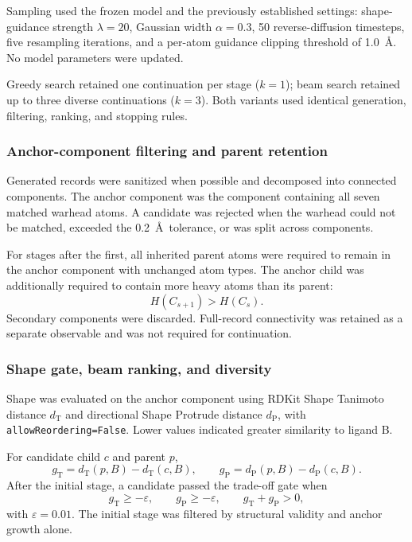 Sampling used the frozen model and the previously established settings:
shape-guidance strength \(\lambda=20\), Gaussian width \(\alpha=0.3\),
50 reverse-diffusion timesteps, five resampling iterations, and a
per-atom guidance clipping threshold of 1.0~\AA. No model parameters
were updated.

Greedy search retained one continuation per stage (\(k=1\)); beam search
retained up to three diverse continuations (\(k=3\)). Both variants used
identical generation, filtering, ranking, and stopping rules.

\subsubsection{Anchor-component filtering and parent retention}

Generated records were sanitized when possible and decomposed into
connected components. The anchor component was the component containing
all seven matched warhead atoms. A candidate was rejected when the
warhead could not be matched, exceeded the 0.2~\AA\ tolerance, or was
split across components.

For stages after the first, all inherited parent atoms were required to
remain in the anchor component with unchanged atom types. The anchor
child was additionally required to contain more heavy atoms than its
parent:
\[
H(C_{s+1})>H(C_s).
\]
Secondary components were discarded. Full-record connectivity was
retained as a separate observable and was not required for continuation.

\subsubsection{Shape gate, beam ranking, and diversity}

Shape was evaluated on the anchor component using RDKit Shape Tanimoto
distance \(d_{\mathrm{T}}\) and directional Shape Protrude distance
\(d_{\mathrm{P}}\), with \texttt{allowReordering=False}. Lower values
indicated greater similarity to ligand B.

For candidate child \(c\) and parent \(p\),
\[
g_{\mathrm{T}}
=
d_{\mathrm{T}}(p,B)-d_{\mathrm{T}}(c,B),
\qquad
g_{\mathrm{P}}
=
d_{\mathrm{P}}(p,B)-d_{\mathrm{P}}(c,B).
\]
After the initial stage, a candidate passed the trade-off gate when
\[
g_{\mathrm{T}}\geq-\varepsilon,
\qquad
g_{\mathrm{P}}\geq-\varepsilon,
\qquad
g_{\mathrm{T}}+g_{\mathrm{P}}>0,
\]
with \(\varepsilon=0.01\). The initial stage was filtered by structural
validity and anchor growth alone.

